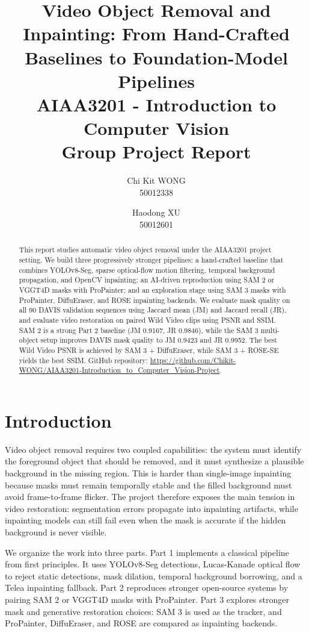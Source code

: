 \documentclass[10pt,twocolumn,letterpaper]{article}
\title{Video Object Removal and Inpainting: From Hand-Crafted Baselines to Foundation-Model Pipelines\\
{\large AIAA3201 - Introduction to Computer Vision}\\
{\large Group Project Report}
}
\author{
  \normalfont Chi Kit WONG \\
  50012338\\
  \and
  Haodong XU \\
  50012601\\
}
\begin{document}
\maketitle

\begin{abstract}
This report studies automatic video object removal under the AIAA3201 project setting. We build three progressively stronger pipelines: a hand-crafted baseline that combines YOLOv8-Seg, sparse optical-flow motion filtering, temporal background propagation, and OpenCV inpainting; an AI-driven reproduction using SAM 2 or VGGT4D masks with ProPainter; and an exploration stage using SAM 3 masks with ProPainter, DiffuEraser, and ROSE inpainting backends. We evaluate mask quality on all 90 DAVIS validation sequences using Jaccard mean (JM) and Jaccard recall (JR), and evaluate video restoration on paired Wild Video clips using PSNR and SSIM. SAM 2 is a strong Part 2 baseline (JM 0.9167, JR 0.9846), while the SAM 3 multi-object setup improves DAVIS mask quality to JM 0.9423 and JR 0.9952. The best Wild Video PSNR is achieved by SAM 3 + DiffuEraser, while SAM 3 + ROSE-SE yields the best SSIM. GitHub repository: \url{https://github.com/Chikit-WONG/AIAA3201-Introduction_to_Computer_Vision-Project}.
\end{abstract}

\section{Introduction}
Video object removal requires two coupled capabilities: the system must identify the foreground object that should be removed, and it must synthesize a plausible background in the missing region. This is harder than single-image inpainting because masks must remain temporally stable and the filled background must avoid frame-to-frame flicker. The project therefore exposes the main tension in video restoration: segmentation errors propagate into inpainting artifacts, while inpainting models can still fail even when the mask is accurate if the hidden background is never visible.

We organize the work into three parts. Part 1 implements a classical pipeline from first principles. It uses YOLOv8-Seg detections, Lucas-Kanade optical flow to reject static detections, mask dilation, temporal background borrowing, and a Telea inpainting fallback. Part 2 reproduces stronger open-source systems by pairing SAM 2 or VGGT4D masks with ProPainter. Part 3 explores stronger mask and generative restoration choices: SAM 3 is used as the tracker, and ProPainter, DiffuEraser, and ROSE are compared as inpainting backends.
\end{document}
